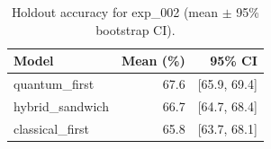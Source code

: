 \begin{table}[ht]
\centering
\caption{Holdout accuracy for exp_002 (mean $\pm$ 95\% bootstrap CI).}
\label{tab:exp_002}
\begin{tabular}{lrr}
\toprule
Model & Mean (\%) & 95\% CI \\
\midrule
quantum\_first & 67.6 & [65.9, 69.4] \\
hybrid\_sandwich & 66.7 & [64.7, 68.4] \\
classical\_first & 65.8 & [63.7, 68.1] \\
\bottomrule
\end{tabular}
\end{table}
